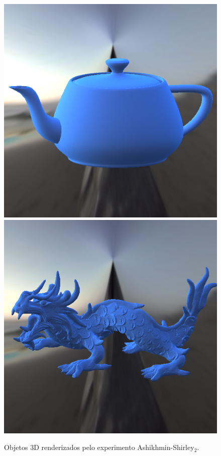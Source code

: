 \begin{figure}[H]
    \caption{\small{Objetos 3D renderizados pelo experimento Ashikhmin-Shirley$_2$.}}\label{fig-ashikhmin-shirley-alternative-eqlang}
  \includegraphics[width=\linewidth]{./Imagens/brdfs/ashikhmin-shirley-alternative-teapot.png}
\endminipage\hfill
{}
  \includegraphics[width=\linewidth]{./Imagens/brdfs/ashikhmin-shirley-alternative-dragon.png}

\end{figure}
